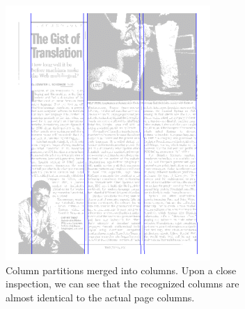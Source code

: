 \begin{figure}[p]
\begin{subfigure}{0.30\textwidth}
\includegraphics[width=\linewidth]{img/tabStopDetection/tessPageSegm4.png}
\caption{Column partitions merged into columns. Upon a close inspection, we can see that the recognized columns are almost identical to the actual page columns.}
\label{fig:segmentationTesseract4}
\end{subfigure}
\quad
\begin{subfigure}{0.30\textwidth}

\end{subfigure}
\end{figure}
